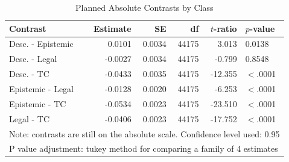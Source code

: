 \documentclass{article}
\begin{document}
\iffalse
\begin{table}[ht]
\centering
\begin{tabular}{lrrrrl}
  \hline
Contrast & Estimate & SE & df & $t$-ratio & $p$-value \\ 
  \hline
\rowcolor{gray!25}Desc. - Epistemic & 0.0101 & 0.0034 & 44175 & 3.013 & 0.0138 \\ 
  Desc. - Legal & -0.0027 & 0.0034 & 44175 & -0.799 & 0.8548 \\ 
\rowcolor{gray!25}  Desc. - TC & -0.0433 & 0.0035 & 44175 & -12.355 & $<$.0001 \\ 
  Epistemic - Legal & -0.0128 & 0.0020 & 44175 & -6.253 & $<$.0001 \\ 
\rowcolor{gray!25}  Epistemic - TC & -0.0534 & 0.0023 & 44175 & -23.510 & $<$.0001 \\ 
  Legal - TC & -0.0406 & 0.0023 & 44175 & -17.752 & $<$.0001 \\ 
   \hline
\multicolumn{6}{l}{{\footnotesize Note: contrasts are still on the absolute scale. Confidence level used: 0.95}}\\
\multicolumn{6}{l}{{\footnotesize P value adjustment: tukey method for comparing a family of 4 estimates}}\\
\end{tabular}
\caption{Planned Absolute Contrasts by Class}
\label{tab:s2m1}
\end{table}
\end{document}
